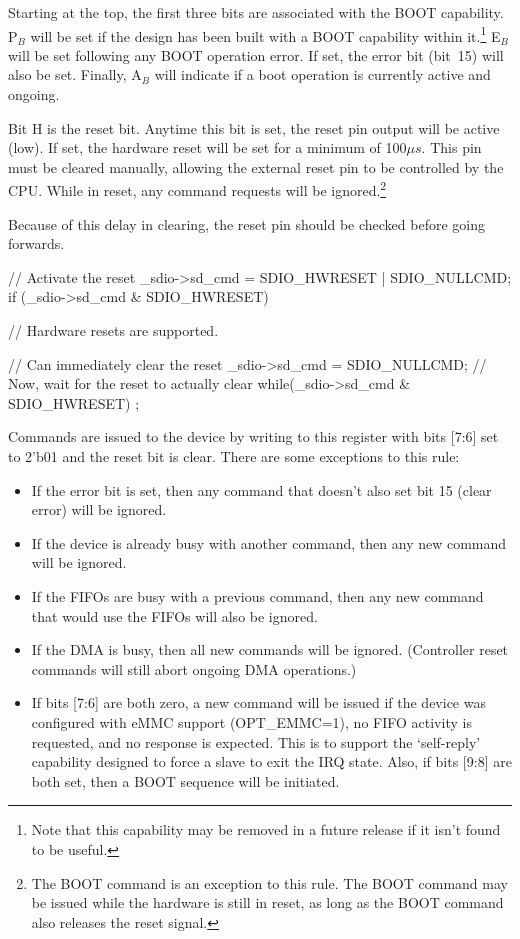 \documentclass{gqtekspec}
\begin{document}
Starting at the top, the first three bits are associated with the BOOT
capability.  P$_B$ will be set if the design has been built with a BOOT
capability within it.\footnote{Note that this capability may be removed
in a future release if it isn't found to be useful.}  E$_B$ will be set
following any BOOT operation error.  If set, the error bit (bit~15) will
also be set.  Finally, A$_B$ will indicate if a boot operation is currently
active and ongoing.

Bit H is the reset bit.  Anytime this bit is set, the reset pin output will
be active (low).  If set, the hardware reset will be set
for a minimum of 100$\mu s$.  This pin must be cleared manually, allowing
the external reset pin to be controlled by the CPU.  While in reset, any
command requests will be ignored.\footnote{The BOOT command is an exception to
this rule.  The BOOT command may be issued while the hardware is still in
reset, as long as the BOOT command also releases the reset signal.}

Because of this delay in clearing, the reset pin should be checked before
going forwards.

\begin{zCpp}
	// Activate the reset
	_sdio->sd_cmd = SDIO_HWRESET | SDIO_NULLCMD;
	if (_sdio->sd_cmd & SDIO_HWRESET) {
		// Hardware resets are supported.

		// Can immediately clear the reset
		_sdio->sd_cmd = SDIO_NULLCMD;
		// Now, wait for the reset to actually clear
		while(_sdio->sd_cmd & SDIO_HWRESET)
			;
	}
\end{zCpp}

Commands are issued to the device by writing to this register with bits [7:6]
set to 2'b01 and the reset bit is clear.  There are some exceptions to this
rule:
\begin{itemize}
\item If the error bit is set, then any command that doesn't also set bit 15
	(clear error) will be ignored.
\item If the device is already busy with another command, then any new command
	will be ignored.
\item If the FIFOs are busy with a previous command, then any new command that
	would use the FIFOs will also be ignored.
\item If the DMA is busy, then all new commands will be ignored.  (Controller
	reset commands will still abort ongoing DMA operations.)
\item If bits [7:6] are both zero, a new command will be issued if the device
	was configured with eMMC support (OPT\_EMMC=1), no FIFO activity
	is requested, and no response is expected.  This is to support the
	`self-reply' capability designed to force a slave to exit the IRQ
	state.  Also, if bits [9:8] are both set, then a BOOT sequence will
	be initiated.
\end{itemize}
\end{document}
